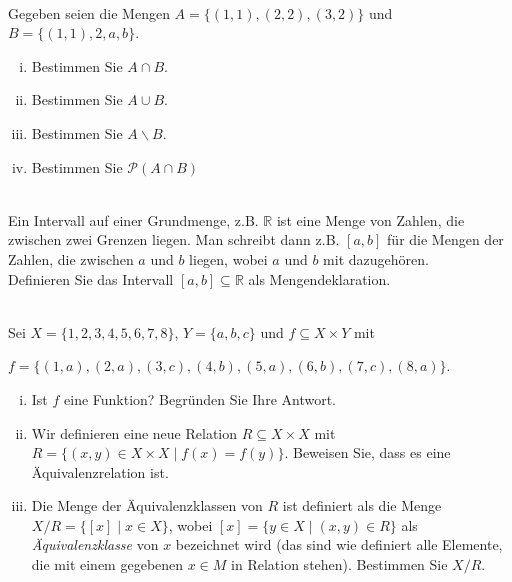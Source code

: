 \newcommand{\printpraesenzlsg}{false}
\newcommand{\printloesungen}{false}
\newcommand{\printbewertungen}{false}
\newcommand{\blattnummer}{1}




\iforiginal{}
\\
Gegeben seien die Mengen $A=\{(1,1),(2,2),(3,2)\}$ und $B=\{(1,1),2,a,b\}$.
\begin{enumerate}[(i)]
    \item Bestimmen Sie $A\cap B$.
    \item Bestimmen Sie $A\cup B$.
    \item Bestimmen Sie $A\backslash B$.
    \item Bestimmen Sie $\mathscr{P}(A\cap B)$
    
\end{enumerate}

\\
Ein Intervall auf einer Grundmenge, z.B. $\mathbb{R}$ ist eine Menge von Zahlen, die zwischen zwei Grenzen liegen.
Man schreibt dann z.B. $[a,b]$ für die Mengen der Zahlen, die zwischen $a$ und $b$ liegen, wobei $a$ und $b$ mit dazugehören.\\
Definieren Sie das Intervall $[a,b]\subseteq\mathbb{R}$ als Mengendeklaration.

\\ 
Sei $X=\{1,2,3,4,5,6,7,8\}$, $Y=\{a,b,c\}$ und $f\subseteq X\times Y$ mit 

$f=\{(1,a),(2,a),(3,c),(4,b),(5,a),(6,b),(7,c),(8,a)\}$.
\begin{enumerate}[(i)]
    \item Ist $f$ eine Funktion? Begründen Sie Ihre Antwort.
    \item Wir definieren eine neue Relation $R\subseteq X\times X$ mit $R=\{(x,y)\in X\times X\mid f(x)=f(y)\}$. Beweisen Sie, dass es eine Äquivalenzrelation ist.
    \item Die Menge der Äquivalenzklassen von $R$ ist definiert als die Menge $X/R=\{[x]\mid x\in X\}$, wobei $[x]=\{y\in X\mid (x,y)\in R\}$ als \textit{Äquivalenzklasse} von $x$ bezeichnet wird (das sind wie definiert alle Elemente, die mit einem gegebenen $x\in M$ in Relation stehen). Bestimmen Sie $X/R$.
\end{enumerate}

